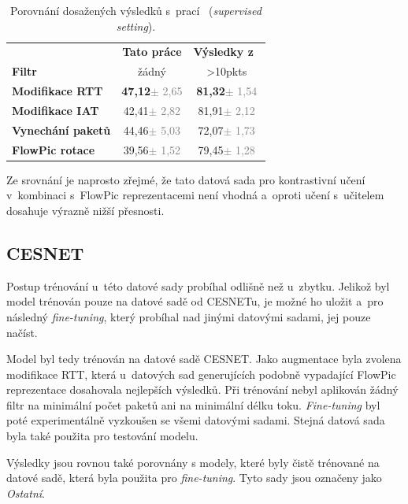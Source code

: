\begin{table}[H]
    \centering
    \begin{tabular}{lcc}
        \toprule
          & \textbf{Tato práce} & \textbf{Výsledky z~\cite{huawei_paper}} \\
          \cmidrule(lr){2-2} \cmidrule(lr){3-3}
         \textbf{Filtr} & žádný & >10pkts \\
        \midrule
        \textbf{Modifikace RTT} & \textbf{47,12}{\tiny\textcolor{gray}{$\pm$ 2,65}} & \textbf{81,32}{\tiny\textcolor{gray}{$\pm$ 1,54}}\\
        \textbf{Modifikace IAT} & 42,41{\tiny\textcolor{gray}{$\pm$ 2,82}} & 81,91{\tiny\textcolor{gray}{$\pm$ 2,12}}\\
        \textbf{Vynechání paketů} & 44,46{\tiny\textcolor{gray}{$\pm$ 5,03}} & 72,07{\tiny\textcolor{gray}{$\pm$ 1,73}}\\
        \textbf{FlowPic rotace} & 39,56{\tiny\textcolor{gray}{$\pm$ 1,52}} & 79,45{\tiny\textcolor{gray}{$\pm$ 1,28}}\\
        \bottomrule
    \end{tabular}
    \caption{Porovnání dosažených výsledků s~prací~\cite{huawei_paper} (\textit{supervised setting}).}
\end{table}

Ze srovnání je naprosto zřejmé, že tato datová sada pro kontrastivní učení v~kombinaci s~FlowPic reprezentacemi není vhodná a~oproti učení s~učitelem dosahuje výrazně nižší přesnosti.

\subsection{CESNET}
Postup trénování u~této datové sady probíhal odlišně než u~zbytku. Jelikož byl model trénován pouze na datové sadě od CESNETu, je možné ho uložit a~pro následný \textit{fine-tuning}, který probíhal nad jinými datovými sadami, jej pouze načíst.

Model byl tedy trénován na datové sadě CESNET. Jako augmentace byla zvolena modifikace RTT, která u~datových sad generujících podobně vypadající FlowPic reprezentace dosahovala nejlepších výsledků. Při trénování nebyl aplikován žádný filtr na minimální počet paketů ani na minimální délku toku. \textit{Fine-tuning} byl poté experimentálně vyzkoušen se všemi datovými sadami. Stejná datová sada byla také použita pro testování modelu.

Výsledky jsou rovnou také porovnány s modely, které byly čistě trénované na datové sadě, která byla použita pro \textit{fine-tuning}. Tyto sady jsou označeny jako \textit{Ostatní}.

